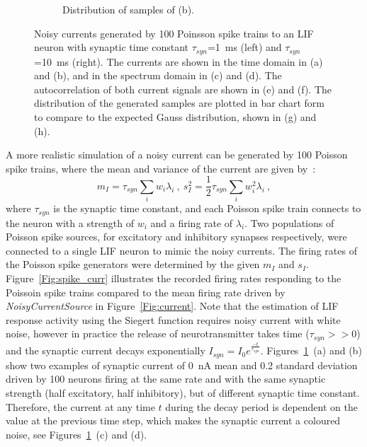 \begin{figure}[tbp!]
\begin{subfigure}[t]{0.43\textwidth}
			\caption{Distribution of samples of (b).}
		\end{subfigure}
		\caption{Noisy currents generated by 100 Poinsson spike trains to an LIF neuron with synaptic time constant $\tau_{syn}$=1~ms (left) and $\tau_{syn}$=10~ms (right). The currents are shown in the time domain in (a) and (b), and in the spectrum domain in (c) and (d). The autocorrelation of both current signals are shown in (e) and (f). The distribution of the generated samples are plotted in bar chart form to compare to the expected Gauss distribution, shown in (g) and (h).}
		\label{Fig:lif_pois}
	\end{figure}

	A more realistic simulation of a noisy current can be generated by 100 Poisson spike trains, 
	where the mean and variance of the current are given by~\cite{la2008response}:
	\begin{equation}
	m_I = \tau_{syn}\sum_i w_i\lambda_{i}~, ~s_I^2=\frac{1}{2}\tau_{syn}\sum_i w_i^2\lambda_{i}~,
	\label{equ:distr0}
	\end{equation}
	where $\tau_{syn}$ is the synaptic time constant, and each Poisson spike train connects to the neuron with a strength of $w_i$ and a firing rate of $\lambda_i$.
	Two populations of Poisson spike sources, for excitatory and inhibitory synapses respectively, were connected to a single LIF neuron to mimic the noisy currents.
	The firing rates of the Poisson spike generators were determined by the given $m_I$ and $s_I$.
	Figure~\ref{Fig:spike_curr} illustrates the recorded firing rates responding to the Poissoin spike trains compared to the mean firing rate driven by \textit{NoisyCurrentSource} in Figure~\ref{Fig:current}.
	Note that the estimation of LIF response activity using the Siegert function requires noisy current with white noise, however
	in practice the release of neurotransmitter takes time ($\tau_{syn} >> 0$) and the synaptic current decays exponentially $I_{syn} = I_0 e^{\frac{-t}{\tau_{syn}}}$.
	Figures~\ref{Fig:lif_pois}~(a) and (b) show two examples of synaptic current of 0~nA mean and 0.2 standard deviation driven by 100 neurons firing at the same rate and with the same synaptic strength (half excitatory, half inhibitory), but of different synaptic time constant.
	Therefore, the current at any time $t$ during the decay period is dependent on the value at the previous time step, which makes the synaptic current a coloured noise, see Figures~\ref{Fig:lif_pois}~(c) and (d).
	
